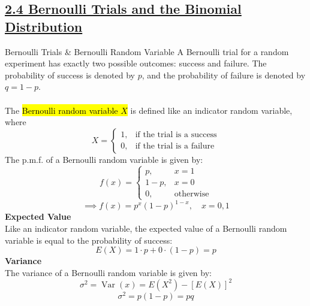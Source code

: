 ﻿\documentclass[12pt]{article}
\begin{document}
\subsection*{\underline{2.4 Bernoulli Trials and the Binomial Distribution}}
\begin{definition}{Bernoulli Trials \& Bernoulli Random Variable}
    A Bernoulli trial for a random experiment has exactly two possible outcomes: success and failure. The probability of success is denoted by $p$, and the probability of failure is denoted by $q=1-p$.\\\\
    The \hl{Bernoulli random variable $X$} is defined like an indicator random variable, where
    \[X = \begin{cases}
    1, & \text{if the trial is a success}\\
    0, & \text{if the trial is a failure}
    \end{cases}\]
    The p.m.f. of a Bernoulli random variable is given by:
    \[f(x) = \begin{cases}
    p, & x=1\\
    1-p, & x=0\\
    0, & \text{otherwise}
    \end{cases}\]
    \[\implies f(x)= p^x(1-p)^{1-x}, \quad x=0,1\]
    \textbf{Expected Value}\\
    Like an indicator random variable, the expected value of a Bernoulli random variable is equal to the probability of success:
    \[E(X) = 1\cdot p + 0\cdot(1-p) = p\]
    \textbf{Variance}\\
    The variance of a Bernoulli random variable is given by:
    \[\sigma^2 = \operatorname{Var}(x) = E(X^2) - [E(X)]^2\]
    \[\sigma^2 = p(1-p) = pq\]
\end{definition}
\end{document}

